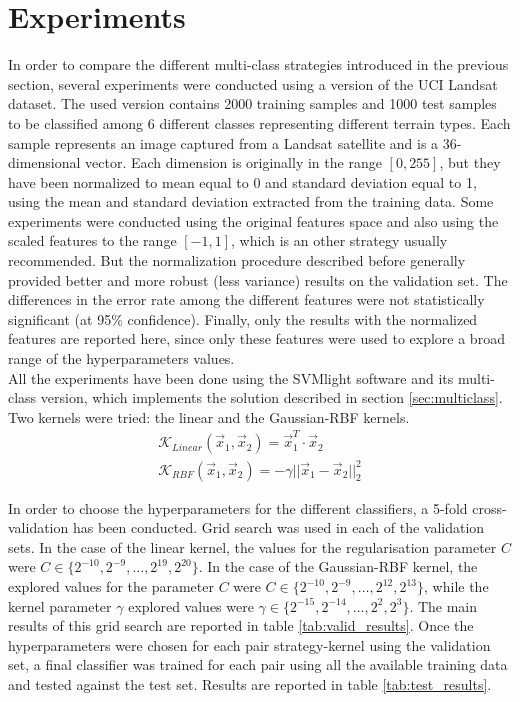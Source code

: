 \documentclass[10pt,a4paper]{article}
\begin{document}
\section{Experiments}
In order to compare the different multi-class strategies introduced in the previous section, several experiments were conducted using a version of the UCI Landsat dataset\cite{Bache+Lichman:2013}. The used version contains 2000 training samples and 1000 test samples to be classified among 6 different classes representing different terrain types. Each sample represents an image captured from a Landsat satellite and is a 36-dimensional vector. Each dimension is originally in the range $[0, 255]$, but they have been normalized to mean equal to 0 and standard deviation equal to 1, using the mean and standard deviation extracted from the training data. Some experiments were conducted using the original features space and also using the scaled features to the range $[-1,1]$, which is an other strategy usually recommended. But the normalization procedure described before generally provided better and more robust (less variance) results on the validation set. The differences in the error rate among the different features were not statistically significant (at 95\% confidence). Finally, only the results with the normalized features are reported here, since only these features were used to explore a broad range of the hyperparameters values.\\

All the experiments have been done using the SVMlight software\cite{joachims1999making} and its multi-class version, which implements the solution described in section \ref{sec:multiclass}. Two kernels were tried: the linear and the Gaussian-RBF kernels.\\

\begin{eqnarray}
\mathcal{K}_{Linear}(\vec{x}_1, \vec{x}_2) = \vec{x}_1^T \cdot \vec{x}_2 \\
\mathcal{K}_{RBF}(\vec{x}_1, \vec{x}_2) = - \gamma ||\vec{x}_1 - \vec{x}_2||_2^2
\end{eqnarray}

In order to choose the hyperparameters for the different classifiers, a 5-fold cross-validation has been conducted. Grid search was used in each of the validation sets. In the case of the linear kernel, the values for the regularisation parameter $C$ were $C \in \{2^{-10}, 2^{-9}, \ldots, 2^{19}, 2^{20} \}$. In the case of the Gaussian-RBF kernel, the explored values for the parameter $C$ were $C \in \{2^{-10}, 2^{-9}, \ldots, 2^{12}, 2^{13}\}$, while the kernel parameter $\gamma$ explored values were $\gamma \in \{2^{-15}, 2^{-14}, \ldots, 2^2, 2^3\}$. The main results of this grid search are reported in table \ref{tab:valid_results}. Once the hyperparameters were chosen for each pair strategy-kernel using the validation set, a final classifier was trained for each pair using all the available training data and tested against the test set. Results are reported in table \ref{tab:test_results}.
\end{document}
